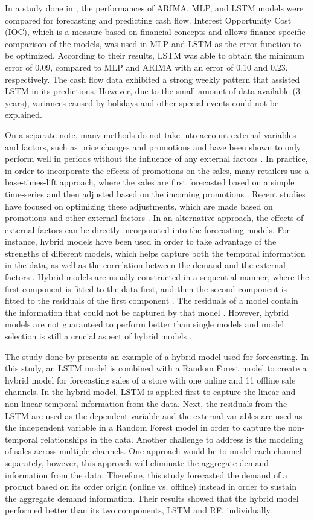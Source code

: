 In a study done in \cite{c11}, the performances of ARIMA, MLP, and LSTM models were compared for forecasting and predicting cash flow.
Interest Opportunity Cost (IOC), which is a measure based on financial concepts and allows finance-specific comparison of the models, was used in MLP and LSTM as the error function to be optimized.
According to their results, LSTM was able to obtain the minimum error of 0.09, compared to MLP and ARIMA with an error of 0.10 and 0.23, respectively.
The cash flow data exhibited a strong weekly pattern that assisted LSTM in its predictions. 
However, due to the small amount of data available (3 years), variances caused by holidays and other special events could not be explained.

On a separate note, many methods do not take into account external variables and factors, such as price changes and promotions and have been shown to only perform well in periods without the influence of any external factors \cite{c2, c3}. 
In practice, in order to incorporate the effects of promotions on the sales, many retailers use a base-times-lift approach, where the sales are first forecasted based on a simple time-series and then adjusted based on the incoming promotions \cite{c4}. 
Recent studies have focused on optimizing these adjustments, which are made based on promotions and other external factors \cite{c4}. 
In an alternative approach, the effects of external factors can be directly incorporated into the forecasting models.
For instance, hybrid models have been used in order to take advantage of the strengths of different models, which helps capture both the temporal information in the data, as well as the correlation between the demand and the external factors \cite{c5, c8}. 
Hybrid models are usually constructed in a sequential manner, where the first component is fitted to the data first, and then the second component is fitted to the residuals of the first component \cite{c12}.
The residuals of a model contain the information that could not be captured by that model \cite{c8}.
However, hybrid models are not guaranteed to perform better than single models and model selection is still a crucial aspect of hybrid models \cite{c12}.

The study done by \cite{c8} presents an example of a hybrid model used for forecasting. 
In this study, an LSTM model is combined with a Random Forest model to create a hybrid model for forecasting sales of a store with one online and 11 offline sale channels.
In the hybrid model, LSTM is applied first to capture the linear and non-linear temporal information from the data. 
Next, the residuals from the LSTM are used as the dependent variable and the external variables are used as the independent variable in a Random Forest model in order to capture the non-temporal relationships in the data. 
Another challenge to address is the modeling of sales across multiple channels. 
One approach would be to model each channel separately, however, this approach will eliminate the aggregate demand information from the data. 
Therefore, this study forecasted the demand of a product based on its order origin (online vs. offline) instead in order to sustain the aggregate demand information.
Their results showed that the hybrid model performed better than its two components, LSTM and RF, individually. 